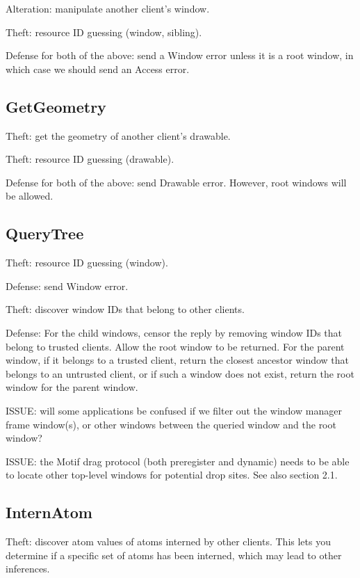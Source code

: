 Alteration: manipulate another client's window.

Theft: resource ID guessing (window, sibling).

Defense for both of the above: send a Window error unless it is a root
window, in which case we should send an Access error.



\subsection{GetGeometry}

Theft: get the geometry of another client's drawable.

Theft: resource ID guessing (drawable).

Defense for both of the above: send Drawable error.  However, root
windows will be allowed.



\subsection{QueryTree}

Theft: resource ID guessing (window).

Defense: send Window error.

Theft: discover window IDs that belong to other clients.

Defense: For the child windows, censor the reply by removing window
IDs that belong to trusted clients.  Allow the root window to be
returned.  For the parent window, if it belongs to a trusted client,
return the closest ancestor window that belongs to an untrusted
client, or if such a window does not exist, return the root window for
the parent window.

ISSUE: will some applications be confused if we filter out the window
manager frame window(s), or other windows between the queried window
and the root window?

ISSUE: the Motif drag protocol (both preregister and dynamic) needs to
be able to locate other top-level windows for potential drop sites.
See also section 2.1.


\subsection{InternAtom}

Theft: discover atom values of atoms interned by other clients.
This lets you determine if a specific set of atoms has been
interned, which may lead to other inferences.

